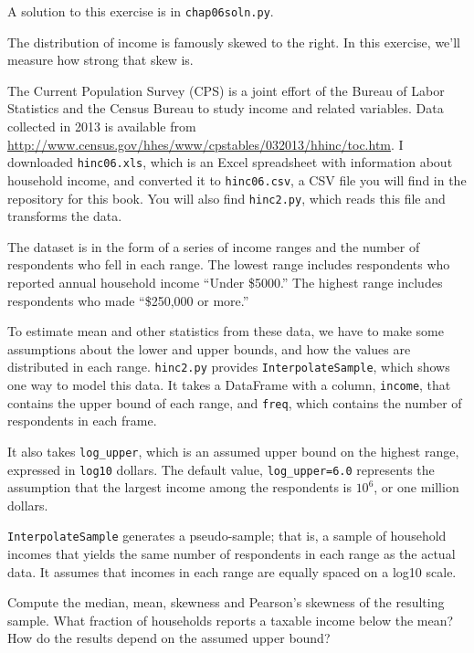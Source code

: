 A solution to this exercise is in \verb"chap06soln.py".

\begin{exercise}

The distribution of income is famously skewed to the right.  In this
exercise, we'll measure how strong that skew is.

The Current Population Survey (CPS) is a joint effort of the Bureau
of Labor Statistics and the Census Bureau to study income and related
variables.  Data collected in 2013 is available from
\url{http://www.census.gov/hhes/www/cpstables/032013/hhinc/toc.htm}.
I downloaded {\tt hinc06.xls}, which is an Excel spreadsheet with
information about household income, and converted it to {\tt hinc06.csv},
a CSV file you will find in the repository for this book.  You
will also find {\tt hinc2.py}, which reads this file and transforms
the data.

The dataset is in the form of a series of income ranges and the number
of respondents who fell in each range.  The lowest range includes
respondents who reported annual household income ``Under \$5000.''
The highest range includes respondents who made ``\$250,000 or
more.''

To estimate mean and other statistics from these data, we have to
make some assumptions about the lower and upper bounds, and how
the values are distributed in each range.  {\tt hinc2.py} provides
{\tt InterpolateSample}, which shows one way to model
this data.  It takes a DataFrame with a column, {\tt income}, that
contains the upper bound of each range, and {\tt freq}, which contains
the number of respondents in each frame.

It also takes \verb"log_upper", which is an assumed upper bound
on the highest range, expressed in {\tt log10} dollars.  
The default value, \verb"log_upper=6.0" represents the assumption
that the largest income among the respondents is
$10^6$, or one million dollars.

{\tt InterpolateSample} generates a pseudo-sample; that is, a sample
of household incomes that yields the same number of respondents
in each range as the actual data.  It assumes that incomes in
each range are equally spaced on a log10 scale.

Compute the median, mean, skewness and Pearson's skewness of the
resulting sample.  What fraction of households reports a taxable
income below the mean?  How do the results depend on the assumed
upper bound?
\end{exercise}


